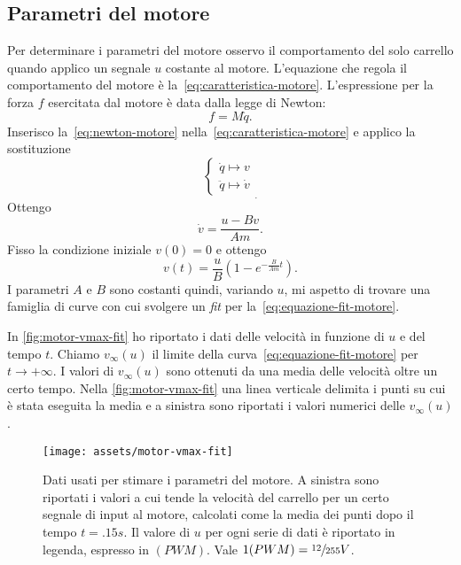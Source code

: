 \subsection{Parametri del motore}
\label{subsec:parametri-motore}
Per determinare i parametri del motore osservo il comportamento del solo
carrello quando applico un segnale $u$ costante al motore.
L'equazione che regola il comportamento del motore è la~\eqref{eq:caratteristica-motore}.
L'espressione per la forza $f$
esercitata dal motore è data dalla legge di Newton:
\begin{equation}
    f = M \ddot q.
    \label{eq:newton-motore}
\end{equation}
Inserisco la~\eqref{eq:newton-motore} nella~\eqref{eq:caratteristica-motore}
e applico la sostituzione
\begin{equation*}
    \left\{
    \begin{aligned}
        \dot q \mapsto v \\
        \ddot q \mapsto \dot v
    \end{aligned}
    \right.
    _.
    \label{eq:sostituzione-motore}
\end{equation*}
Ottengo
\begin{equation*}
    \dot v = \frac{u - B v} {Am}.
\end{equation*}
Fisso la condizione iniziale $v(0) = 0$ e ottengo
\begin{equation}
    v(t) = \frac u B \left(1 - e^{-\frac B {Am} t}\right).
    \label{eq:equazione-fit-motore}
\end{equation}
I parametri $A$ e $B$ sono costanti quindi, variando $u$, mi aspetto di trovare
una famiglia di curve con cui svolgere un \emph{fit} per la~\eqref{eq:equazione-fit-motore}.

In \autoref{fig:motor-vmax-fit} ho riportato i dati delle velocità in funzione di
$u$ e del tempo $t$.
Chiamo $v_\infty(u)$ il limite della
curva~\eqref{eq:equazione-fit-motore} per $t \to +\infty$.
I valori di
$v_\infty(u)$ sono ottenuti da una media delle velocità oltre un certo tempo.
Nella \autoref{fig:motor-vmax-fit} una linea verticale delimita i punti su cui è
stata eseguita la media e a sinistra sono riportati i valori numerici delle $v_\infty(u)$.

\begin{figure}[H]
    \centering
    \texttt{[image: assets/motor-vmax-fit]}
    \caption[Dati per stimare i parametri del motore]{Dati usati
    per stimare i parametri del motore. A sinistra sono riportati i valori
    a cui tende la velocità del carrello per un certo segnale di input al
    motore, calcolati come la media dei punti dopo il tempo $t = .15s$.
    Il valore di $u$ per ogni serie di dati è riportato in legenda, espresso
    in $(PWM)$. Vale $1 (PWM) = \sfrac {12}{255}V$.
    }
    \label{fig:motor-vmax-fit}
\end{figure}

